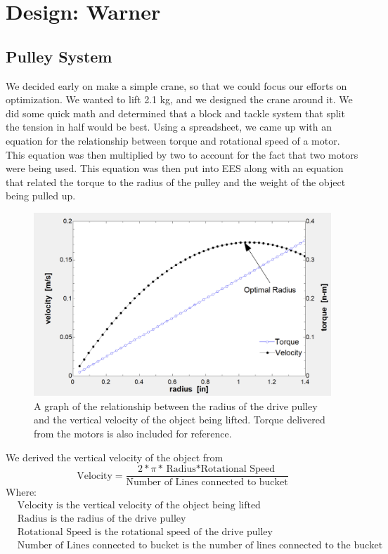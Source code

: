 \documentclass[letterpaper, 12pt]{article}
\begin{document}
\section{Design: Warner}
\subsection{Pulley System}
\label{sec:Pulley}
We decided early on make a simple crane, so that we could focus our efforts on optimization.
We wanted to lift 2.1 kg, and we designed the crane around it. 
We did some quick math and determined that a block and tackle system that split the tension in half would be best. 
Using a spreadsheet, we came up with an equation for the relationship between torque and rotational speed of a motor. 
This equation was then multiplied by two to account for the fact that two motors were being used. 
This equation was then put into EES along with an equation that related the torque to the radius of the pulley and the weight of the object being pulled up.

\begin{figure}[H]
    \centering
    \includegraphics[width =.45\linewidth]{Torque_Speed.png}
    \caption{A graph of the relationship between the radius of the drive pulley and the vertical velocity of the object being lifted. Torque delivered from the motors is also included for reference.}
    \label{fig:Torque_Speed}
\end{figure}

We derived the vertical velocity of the object from 
\begin{equation}
    \text{Velocity}=\frac{2*\pi*{\text{Radius}*\text{Rotational Speed}}}{\text{Number of Lines connected to bucket}}
\end{equation}
Where:
\begin{equation}
    \begin{split}
       & \text{Velocity} \text{ is the vertical velocity of the object being lifted} \\
        &\text{Radius}  \text{ is the radius of the drive pulley} \\
        &\text{Rotational Speed}  \text{ is the rotational speed of the drive pulley} \\
        &\text{Number of Lines connected to bucket}  \text{ is the number of lines connected to the bucket}
    \end{split}
\end{equation}
\end{document}
